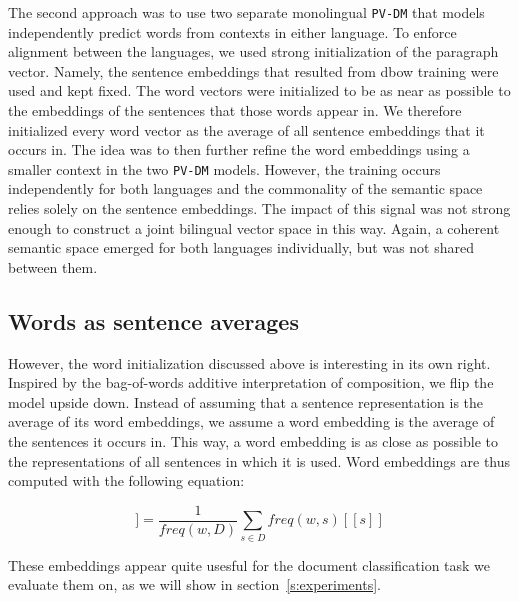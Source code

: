 The second approach was to use two separate monolingual \texttt{PV-DM} that models  independently predict words from contexts in either language. To enforce alignment between the languages, we used strong initialization of the paragraph vector. Namely, the sentence embeddings that resulted from dbow training were used and kept fixed.
The word vectors were initialized to be as near as possible to the embeddings of the sentences that those words appear in.
We therefore initialized every word vector as the average of all sentence embeddings that it occurs in.
The idea was to then further refine the word embeddings using a smaller context in the two \texttt{PV-DM} models.
However, the training occurs independently for both languages and the commonality of the semantic space relies solely on the sentence embeddings. The impact of this signal was not strong enough to construct a joint bilingual vector space in this way. Again, a coherent semantic space emerged for both languages individually, but was not shared between them. 


% 



\subsection{Words as sentence averages}

However, the word initialization discussed above is interesting in its own right.
Inspired by the bag-of-words additive interpretation of composition, we flip the model upside down.
Instead of assuming that a sentence representation is the average of its word embeddings, we assume a word embedding is the average of the sentences it occurs in.
This way, a word embedding is as close as possible to the representations of all sentences in which it is used.
Word embeddings are thus computed with the following equation:

\begin{equation*}
[\![ w ]\!] =\frac{1}{freq(w,D)}\sum_{s\in D}freq(w,s) [\![ s ]\!]
\end{equation*}

These embeddings appear quite usesful for the document classification task we evaluate them on, as we will show in section~\ref{s:experiments}.

